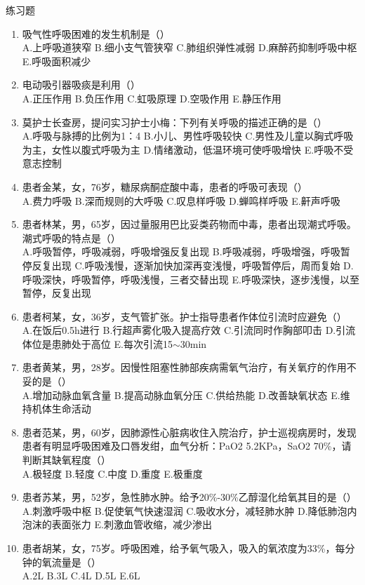 \documentclass[11pt, a4paper]{ctexart}
\begin{document}
\begin{examplebox}{练习题}
	\begin{enumerate}
		\item 吸气性呼吸困难的发生机制是（\qquad）\\
		      A.上呼吸道狭窄 \quad B.细小支气管狭窄 \quad C.肺组织弹性减弱 \quad D.麻醉药抑制呼吸中枢 \quad E.呼吸面积减少
		\item 电动吸引器吸痰是利用（\qquad）\\
		      A.正压作用 \quad B.负压作用 \quad C.虹吸原理 \quad D.空吸作用 \quad E.静压作用
		\item 莫护士长查房，提问实习护士小梅：下列有关呼吸的描述正确的是（\qquad）\\
		      A.呼吸与脉搏的比例为1：4 \quad B.小儿、男性呼吸较快 \quad C.男性及儿童以胸式呼吸为主，女性以腹式呼吸为主 \quad D.情绪激动，低温环境可使呼吸增快 \quad E.呼吸不受意志控制
		\item 患者金某，女，76岁，糖尿病酮症酸中毒，患者的呼吸可表现（\qquad）\\
		      A.费力呼吸 \quad B.深而规则的大呼吸 \quad C.叹息样呼吸 \quad D.蝉鸣样呼吸 \quad E.鼾声呼吸
		\item 患者林某，男，65岁，因过量服用巴比妥类药物而中毒，患者出现潮式呼吸。潮式呼吸的特点是（\qquad）\\
		      A.呼吸暂停，呼吸减弱，呼吸增强反复出现 \quad B.呼吸减弱，呼吸增强，呼吸暂停反复出现 \quad C.呼吸浅慢，逐渐加快加深再变浅慢，呼吸暂停后，周而复始 \quad D.呼吸深快，呼吸暂停，呼吸浅慢，三者交替出现 \quad E.呼吸深快，逐步浅慢，以至暂停，反复出现
		\item 患者柯某，女，36岁，支气管扩张。护士指导患者作体位引流时应避免（\qquad）\\
		      A.在饭后0.5h进行 \quad B.行超声雾化吸入提高疗效 \quad C.引流同时作胸部叩击 \quad D.引流体位是患肺处于高位 \quad E.每次引流15$\sim$30min
		\item 患者黄某，男，28岁。因慢性阻塞性肺部疾病需氧气治疗，有关氧疗的作用不妥的是（\qquad）\\
		      A.增加动脉血氧含量 \quad B.提高动脉血氧分压 \quad C.供给热能 \quad D.改善缺氧状态 \quad E.维持机体生命活动
		\item 患者范某，男，60岁，因肺源性心脏病收住入院治疗，护士巡视病房时，发现患者有明显呼吸困难及口唇发绀，血气分析：PaO2 5.2KPa，SaO2 70\%，请判断其缺氧程度（\qquad）\\
		      A.极轻度 \quad B.轻度 \quad C.中度 \quad D.重度 \quad E.极重度
		\item 患者苏某，男，52岁，急性肺水肿。给予20\%-30\%乙醇湿化给氧其目的是（\qquad）\\
		      A.刺激呼吸中枢 \quad B.促使氧气快速湿润 \quad C.吸收水分，减轻肺水肿 \quad D.降低肺泡内泡沫的表面张力 \quad E.刺激血管收缩，减少渗出
		\item 患者胡某，女，75岁。呼吸困难，给予氧气吸入，吸入的氧浓度为33\%，每分钟的氧流量是（\qquad）\\
		      A.2L \quad B.3L \quad C.4L \quad D.5L \quad E.6L
	\end{enumerate}
\end{examplebox}
\end{document}
